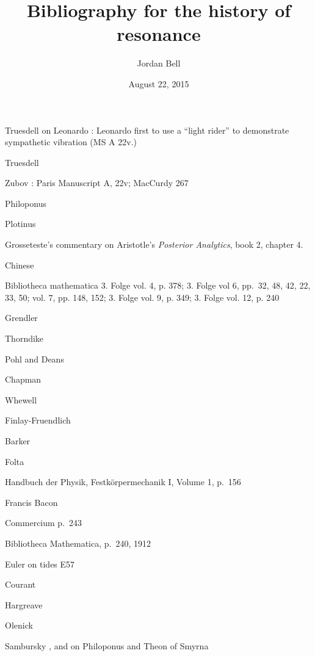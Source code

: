 \documentclass{article}
\begin{document}
\title{Bibliography for the history of resonance}
\author{Jordan Bell}
\date{August 22, 2015}

\maketitle

Truesdell on Leonardo \cite[pp.~18--20]{truesdell1968I}: Leonardo
first to use a ``light rider'' to demonstrate sympathetic vibration 
(MS A 22v.)

Truesdell \cite[p.~108]{truesdell1968II}

Zubov \cite[p.~88]{zubov}: Paris Manuscript A, 22v; MacCurdy 267

Philoponus \cite[pp.~46, 135]{lacey}

Plotinus \cite[p.~155]{sorabji}

Grosseteste's commentary on Aristotle's {\em Posterior Analytics}, book 2, chapter 4.

Chinese \cite[pp.~14,15,1814]{selin}

Bibliotheca mathematica 3. Folge vol. 4, p. 378; 3. Folge vol 6, pp.~32, 48, 42,
22, 33, 50; vol. 7, pp. 148, 152; 3. Folge vol. 9, p. 349; 3. Folge vol. 12,
p. 240

Grendler \cite[p.~11]{grendler}

Thorndike \cite[p.~600]{thorndike}

Pohl and Deans \cite[p.~259]{pohl}

Chapman \cite[Chapter 10]{chapman}

Whewell \cite[p.~297]{whewell}

Finlay-Fruendlich \cite[pp.~95, 117]{fruendlich}

Barker \cite[p.~116]{barker}

Folta \cite[p.~103]{folta}

Handbuch der Physik, Festk\"orpermechanik I, Volume 1, p.~156

Francis Bacon \cite[pp.~141--152]{bacon}

Commercium p.~243

Bibliotheca Mathematica, p.~240, 1912

Euler on tides E57 \cite[pp.~300--304]{E57}

Courant \cite[p.~514]{courant}

Hargreave \cite[p.~102]{hargreave}

Olenick \cite[p.~400]{olenick}

Sambursky \cite[pp.~9, 41--42]{sambursky1959}, and on Philoponus and
Theon of Smyrna \cite[pp.~100--104]{sambursky1962}
\end{document}
